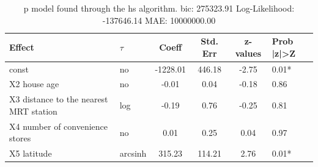 \begin{table}
	\caption{p model found through the hs algorithm. bic: 275323.91 Log-Likelihood: -137646.14 MAE: 10000000.00}
	\begin{center}
		\begin{tabular}{|l|l|c|c|c|l|}
			\hline
			Effect & $\tau$ & Coeff & Std. Err & z-values & Prob |z|>Z \\
			\hline
			const & no & -1228.01 & 446.18 & -2.75 & 0.01* \\
			\hline
			X2 house age & no & -0.01 & 0.04 & -0.18 & 0.86 \\
			\hline
			X3 distance to the nearest MRT station & log & -0.19 & 0.76 & -0.25 & 0.81 \\
			\hline
			X4 number of convenience stores & no & 0.01 & 0.25 & 0.04 & 0.97 \\
			\hline
			X5 latitude & arcsinh & 315.23 & 114.21 & 2.76 & 0.01* \\
			\hline
		\end{tabular}
	\end{center}
\end{table}